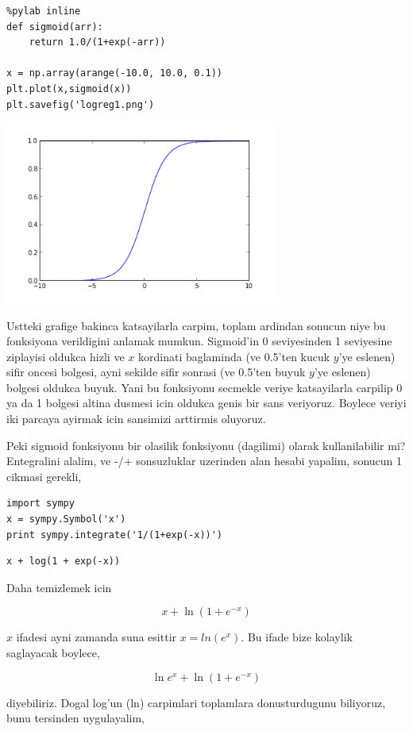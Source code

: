 \documentclass[12pt,fleqn]{article}\usepackage{../common}
\begin{document}
\begin{verbatim}
%pylab inline
def sigmoid(arr):
    return 1.0/(1+exp(-arr))

x = np.array(arange(-10.0, 10.0, 0.1))
plt.plot(x,sigmoid(x))
plt.savefig('logreg1.png')
\end{verbatim}

\includegraphics[height=6cm]{logreg1.png}

Ustteki grafige bakinca katsayilarla carpim, toplam ardindan sonucun
niye bu fonksiyona verildigini anlamak mumkun. Sigmoid'in 0
seviyesinden 1 seviyesine ziplayisi oldukca hizli ve $x$ kordinati
baglaminda (ve 0.5'ten kucuk $y$'ye eslenen) sifir oncesi bolgesi,
ayni sekilde sifir sonrasi (ve 0.5'ten buyuk $y$'ye eslenen) bolgesi
oldukca buyuk. Yani bu fonksiyonu secmekle veriye katsayilarla
carpilip 0 ya da 1 bolgesi altina dusmesi icin oldukca genis bir sans
veriyoruz.  Boylece veriyi iki parcaya ayirmak icin sansimizi
arttirmis oluyoruz.


Peki sigmoid fonksiyonu bir olasilik fonksiyonu (dagilimi) olarak
kullanilabilir mi?  Entegralini alalim, ve -/+ sonsuzluklar uzerinden
alan hesabi yapalim, sonucun 1 cikmasi gerekli,

\begin{verbatim}
import sympy
x = sympy.Symbol('x')
print sympy.integrate('1/(1+exp(-x))')
\end{verbatim}

\begin{verbatim}
x + log(1 + exp(-x))
\end{verbatim}

Daha temizlemek icin

$$ x + \ln(1 + e^{-x}) $$

$x$ ifadesi ayni zamanda suna esittir $x=ln( e^{x} )$. Bu ifade bize
kolaylik saglayacak boylece,

$$ \ln e^{x} + \ln(1+e^{-x})  $$

diyebiliriz. Dogal log'un (ln) carpimlari toplamlara donusturdugunu
biliyoruz, bunu tersinden uygulayalim,
\end{document}

